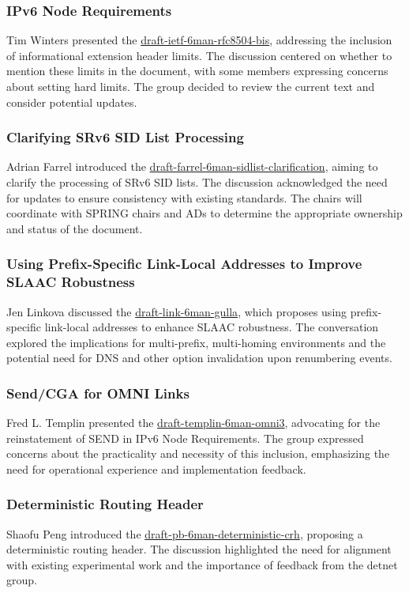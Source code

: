 \documentclass{article}
\begin{document}
\subsubsection{IPv6 Node Requirements}
Tim Winters presented the \href{https://datatracker.ietf.org/doc/html/draft-ietf-6man-rfc8504-bis}{draft-ietf-6man-rfc8504-bis}, addressing the inclusion of informational extension header limits. The discussion centered on whether to mention these limits in the document, with some members expressing concerns about setting hard limits. The group decided to review the current text and consider potential updates.

\subsubsection{Clarifying SRv6 SID List Processing}
Adrian Farrel introduced the \href{https://datatracker.ietf.org/doc/html/draft-farrel-6man-sidlist-clarification}{draft-farrel-6man-sidlist-clarification}, aiming to clarify the processing of SRv6 SID lists. The discussion acknowledged the need for updates to ensure consistency with existing standards. The chairs will coordinate with SPRING chairs and ADs to determine the appropriate ownership and status of the document.

\subsubsection{Using Prefix-Specific Link-Local Addresses to Improve SLAAC Robustness}
Jen Linkova discussed the \href{https://datatracker.ietf.org/doc/html/draft-link-6man-gulla}{draft-link-6man-gulla}, which proposes using prefix-specific link-local addresses to enhance SLAAC robustness. The conversation explored the implications for multi-prefix, multi-homing environments and the potential need for DNS and other option invalidation upon renumbering events.

\subsubsection{Send/CGA for OMNI Links}
Fred L. Templin presented the \href{https://datatracker.ietf.org/doc/html/draft-templin-6man-omni3}{draft-templin-6man-omni3}, advocating for the reinstatement of SEND in IPv6 Node Requirements. The group expressed concerns about the practicality and necessity of this inclusion, emphasizing the need for operational experience and implementation feedback.

\subsubsection{Deterministic Routing Header}
Shaofu Peng introduced the \href{https://datatracker.ietf.org/doc/html/draft-pb-6man-deterministic-crh}{draft-pb-6man-deterministic-crh}, proposing a deterministic routing header. The discussion highlighted the need for alignment with existing experimental work and the importance of feedback from the detnet group.
\end{document}

